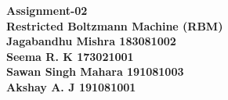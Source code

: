 \documentclass[10pt, a4paper, oneside]{Thesis} %
\begin{document}
% 
% 
% 
% 
% 
% 
% 
% 
% 
% 
% 
% 
% 
% 
% 
%
\begin{titlepage}
\vspace*{\fill}
\begingroup
\centering
\textbf {\Huge Assignment-02}\\ 
\textbf{\huge Restricted Boltzmann Machine (RBM)}\\
\vspace*{\fill}
\textbf{Jagabandhu Mishra \hspace{0.3} 183081002}\\
 \textbf{Seema R. K  \hspace{0.3} 173021001}\\
 \textbf{Sawan Singh Mahara \hspace{0.3} 191081003}\\
 \textbf{Akshay A. J  \hspace{0.3} 191081001}\\
 \
\endgroup
\vspace*{\fill}

\centering
\end{titlepage}
\end{document}
